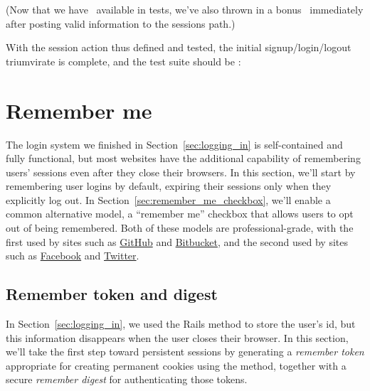 \noindent (Now that we have \ available in tests, we've also thrown in a bonus \ immediately after posting valid information to the sessions path.)

With the session  action thus defined and tested, the initial  sign\-up/\-login/\-logout triumvirate is complete, and the test suite should be \passing:

\begin{codelisting}
\codecaption{\passing}
\end{codelisting}

\section{Remember me} %
\label{sec:remember_me}

The login system we finished in Section~\ref{sec:logging_in} is self-contained and fully functional, but most websites have the additional capability of remembering users' sessions even after they close their browsers. In this section, we'll start by remembering user logins by default, expiring their sessions only when they explicitly log out. In Section~\ref{sec:remember_me_checkbox}, we'll enable a common alternative model, a ``remember me'' checkbox that allows users to opt out of being remembered. Both of these models are professional-grade, with the first used by sites such as \href{http://github.com/}{GitHub} and \href{http://bitbucket.org/}{Bitbucket}, and the second used by sites such as \href{http://www.facebook.com/}{Facebook} and \href{http://twitter.com/}{Twitter}.

    \subsection{Remember token and digest} %
    \label{sec:remember_token}

In Section~\ref{sec:logging_in}, we used the Rails  method to store the user's id, but this information disappears when the user closes their browser. In this section, we'll take the first step toward persistent sessions by generating a \emph{remember token} appropriate for creating permanent cookies using the  method, together with a secure \emph{remember digest} for authenticating those tokens.

